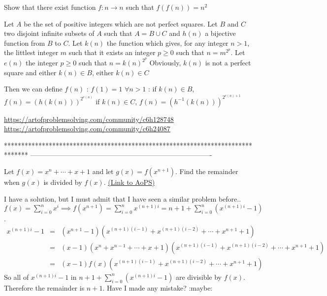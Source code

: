 \begin{mysolution}
	\begin{tcolorbox}Show that there exist function $ f: n\to n$ such that $ f(f(n)) = n^{2}$\end{tcolorbox}

Let $ A$ be the set of positive integers which are not perfect squares.
Let $ B$ and $ C$ two disjoint infinite subsets of $ A$ such that $ A=B\cup C$ and  $ h(n)$ a bijective function from $ B$ to $ C$.
Let $ k(n)$ the function which gives, for any integer $ n>1$, the littlest integer $ m$ such that it exists an integer $ p\geq 0$ such that $ n=m^{2^{p}}$. 
Let $ e(n)$ the integer $ p\geq 0$ such that $ n=k(n)^{2^{p}}$
Obviously, $ k(n)$ is not a perfect square and either $ k(n)\in B$, either $ k(n)\in C$

Then we can define $ f(n)$ :
$ f(1)=1$
$ \forall n>1$ :
if $ k(n)\in B$, $ f(n)=(h(k(n)))^{2^{e(n)}}$
if $ k(n)\in C$, $ f(n)=(h^{-1}(k(n)))^{2^{e(n)+1}}$
\end{mysolution}



\begin{mysolution}
\url{https://artofproblemsolving.com/community/c6h128748}
\url{https://artofproblemsolving.com/community/c6h24087}
\end{mysolution}
*******************************************************************************
-------------------------------------------------------------------------------

\begin{problem}
	Let $ f(x) =x^{n}+ \cdots + x + 1$ and let $ g(x) = f(x^{n+1})$. Find the remainder when $ g(x)$ is divided by $ f(x)$.
	\flushright \href{https://artofproblemsolving.com/community/c6h163042}{(Link to AoPS)}
\end{problem}



\begin{mysolution}
	I have a solution, but I must admit that I have seen a similar problem before..
$ f(x)=\sum_{i=0}^{n}x^{i}\implies f(x^{n+1})=\sum_{i=0}^{n}x^{(n+1)i}=n+1+\sum_{i=0}^{n}\left(x^{(n+1)i}-1\right)$. 
\begin{eqnarray*}x^{(n+1)i}-1&=&\left(x^{n+1}-1\right)\left(x^{(n+1)(i-1)}+x^{(n+1)(i-2)}+\cdots+x^{n+1}+1\right)\\ &=&\left(x-1\right)\left(x^{n}+x^{n-1}+\cdots+x+1\right)\left(x^{(n+1)(i-1)}+x^{(n+1)(i-2)}+\cdots+x^{n+1}+1\right)\\ &=&\left(x-1\right)f(x)\left(x^{(n+1)(i-1)}+x^{(n+1)(i-2)}+\cdots+x^{n+1}+1\right)\end{eqnarray*}
So all of $ x^{(n+1)i}-1$ in $ n+1+\sum_{i=0}^{n}\left(x^{(n+1)i}-1\right)$ are divisible by $ f(x)$. Therefore the remainder is $ \boxed{n+1}$.
Have I made any mistake?  :maybe:
\end{mysolution}



